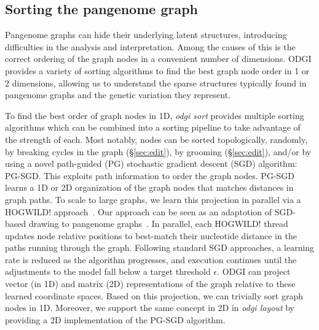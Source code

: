 \documentclass{bioinfo}
\begin{document}
\subsection{Sorting the pangenome graph}
\label{sec:sort}

Pangenome graphs can hide their underlying latent structures, introducing difficulties in the analysis and interpretation. %
Among the causes of this is the correct ordering of the graph nodes in a convenient number of dimensions.
ODGI provides a variety of sorting algorithms to find the best graph node order in 1 or 2 dimensions, allowing us
to understand the sparse structures typically found in pangenome graphs and the genetic variation they represent.

To find the best order of graph nodes in 1D, \textit{odgi sort} provides multiple sorting algorithms which can be combined into a sorting pipeline to take advantage of the strength of each.
Most notably, nodes can be sorted topologically, randomly, by breaking cycles in the graph (\S\ref{sec:edit}), by grooming (\S\ref{sec:edit}), and/or by using a novel path-guided (PG) stochastic gradient descent (SGD) algorithm: PG-SGD.
This exploits path information to order the graph nodes.
PG-SGD learns a 1D or 2D organization of the graph nodes that matches distances in graph paths.
To scale to large graphs, we learn this projection in parallel via a HOGWILD! approach~\citep{niu2011hogwild}.
Our approach can be seen as an adaptotion of SGD-based drawing to pangenome graphs~\citep{zheng2018graph}.
In parallel, each HOGWILD! thread updates node relative positions to best-match their nucleotide distance in the paths running through the graph.
Following standard SGD approaches, a learning rate is reduced as the algorithm progresses, and execution continues until the adjustments to the model fall below a target threshold $\epsilon$.
ODGI can project vector (in 1D) and matrix (2D) representations of the graph relative to these learned coordinate spaces.
Based on this projection, we can trivially sort graph nodes in 1D.
Moreover, we support the same concept in 2D in \textit{odgi layout} by providing a 2D implementation of the PG-SGD algorithm.



\end{document}
